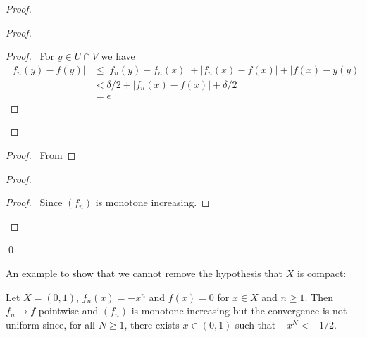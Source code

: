 \begin{proof}
    \pf
    \begin{proof}
        \begin{proof}
            \pf\ For $y \in U \cap V$ we have
            \begin{align*}
                |f_n(y) - f(y)| & \leq |f_n(y) - f_n(x)| + |f_n(x) - f(x)| + |f(x) - y(y)| \\
                & < \delta / 2 + |f_n(x) - f(x)| + \delta / 2 \\
                & = \epsilon
            \end{align*}
        \end{proof}
    \end{proof}
    \begin{proof}
        \pf\ From 
    \end{proof}
    \begin{proof}
        \begin{proof}
            \pf\ Since $(f_n)$ is monotone increasing.
        \end{proof}
    \end{proof}
    \qed
\end{proof}

An example to show that we cannot remove the hypothesis that $X$ is compact:

\begin{example}
    Let $X = (0,1)$, $f_n(x) = -x^n$ and $f(x) = 0$ for $x \in X$ and $n \geq 1$. Then $f_n \rightarrow f$ pointwise and $(f_n)$ is monotone
    increasing but the convergence is not uniform since, for all $N \geq 1$, there exists $x \in (0,1)$ such that $-x^N < -1/2$.
\end{example}

